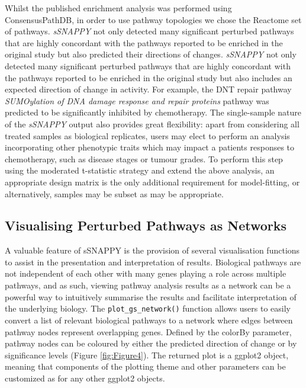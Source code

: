 \documentclass[9pt,a4paper,]{extarticle}
\begin{document}
Whilst the published enrichment analysis was performed using ConsensusPathDB\citep{Kamburov2012}, in order to use pathway topologies we chose the Reactome set of pathways\citep{reactome2021}.
\emph{sSNAPPY} not only detected many significant perturbed pathways that are highly concordant with the pathways reported to be enriched in the original study but also predicted their directions of changes.
\emph{sSNAPPY} not only detected many significant perturbed pathways that are highly concordant with the pathways reported to be enriched in the original study but also includes an expected direction of change in activity.
For example, the DNT repair pathway \emph{SUMOylation of DNA damage response and repair proteins} pathway was predicted to be significantly inhibited by chemotherapy.
The single-sample nature of the \emph{sSNAPPY} output also provides great flexibility: apart from considering all treated samples as biological replicates, users may elect to perform an analysis incorporating other phenotypic traits which may impact a patients responses to chemotherapy, such as disease stages or tumour grades.
To perform this step using the moderated t-statistic strategy and extend the above analysis, an appropriate design matrix is the only additional requirement for model-fitting, or alternatively, samples may be subset as may be appropriate.

\hypertarget{visualising-perturbed-pathways-as-networks}{%
\subsection{Visualising Perturbed Pathways as Networks}\label{visualising-perturbed-pathways-as-networks}}

A valuable feature of sSNAPPY is the provision of several visualisation functions to assist in the presentation and interpretation of results.
Biological pathways are not independent of each other with many genes playing a role across multiple pathways, and as such, viewing pathway analysis results as a network can be a powerful way to intuitively summarise the results and facilitate interpretation of the underlying biology.
The \texttt{plot\_gs\_network()} function allows users to easily convert a list of relevant biological pathways to a network where edges between pathway nodes represent overlapping genes.
Defined by the colorBy parameter, pathway nodes can be coloured by either the predicted direction of change or by significance levels (Figure \ref{fig:Figure4}).
The returned plot is a ggplot2\citep{Wickham2009} object, meaning that components of the plotting theme and other parameters can be customized as for any other ggplot2 objects.
\end{document}
